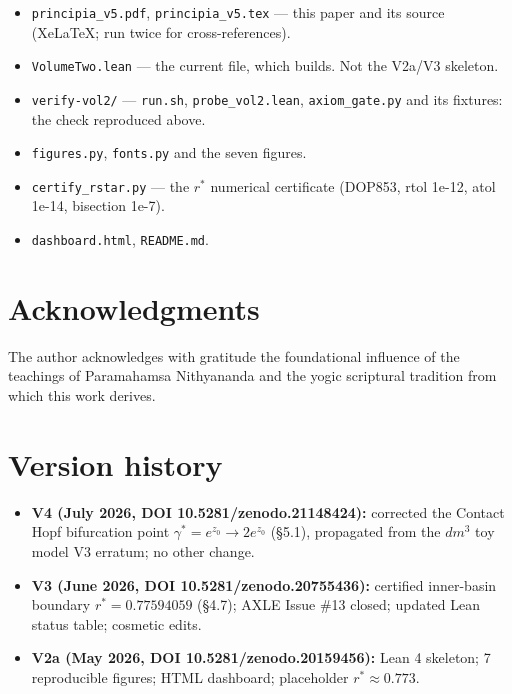 \documentclass[11pt]{article}
\theoremstyle{boxed}
\begin{document}
\begin{itemize}[nosep]
  \item \texttt{principia\_v5.pdf}, \texttt{principia\_v5.tex} --- this paper and its source
        (XeLaTeX; run twice for cross-references).
  \item \texttt{VolumeTwo.lean} --- the current file, which builds. Not the V2a/V3 skeleton.
  \item \texttt{verify-vol2/} --- \texttt{run.sh}, \texttt{probe\_vol2.lean},
        \texttt{axiom\_gate.py} and its fixtures: the check reproduced above.
  \item \texttt{figures.py}, \texttt{fonts.py} and the seven figures.
  \item \texttt{certify\_rstar.py} --- the $r^{*}$ numerical certificate (DOP853, rtol 1e-12,
        atol 1e-14, bisection 1e-7).
  \item \texttt{dashboard.html}, \texttt{README.md}.
\end{itemize}

\section*{Acknowledgments}

The author acknowledges with gratitude the foundational influence of the teachings
of Paramahamsa Nithyananda and the yogic scriptural tradition from which this work derives.

\section*{Version history}

\begin{itemize}[leftmargin=2em]
  \item \textbf{V4 (July 2026, DOI 10.5281/zenodo.21148424):} corrected the Contact Hopf bifurcation point $\gamma^{*}=e^{z_0}\to2e^{z_0}$ (\S 5.1), propagated from the $dm^3$ toy model V3 erratum; no other change.
  \item \textbf{V3 (June 2026, DOI 10.5281/zenodo.20755436):} certified inner-basin boundary $r^{*} = 0.77594059$ (\S 4.7); AXLE Issue \#13 closed; updated Lean status table; cosmetic edits.
  \item \textbf{V2a (May 2026, DOI 10.5281/zenodo.20159456):} Lean 4 skeleton; 7 reproducible figures; HTML dashboard; placeholder $r^{*} \approx 0.773$.
\end{itemize}
\end{document}
